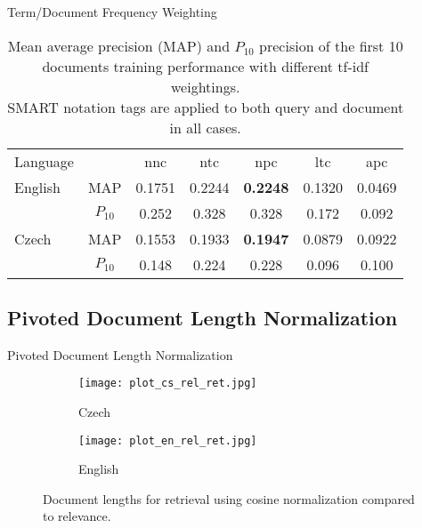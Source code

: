 \documentclass{beamer}
\begin{document}
\begin{frame}{Term/Document Frequency Weighting}

\begin{table}[htpb]
	\centering
	\caption{Mean average precision (MAP) and $P_{10}$ precision of the first
		10 documents training performance with different tf-idf weightings.\\
	SMART notation tags are applied to both query and document in all cases.\\}
	\label{tab:tfidf}
	\begin{tabular}{@{}l|cccccc@{}}
		\toprule
		Language & & nnc & ntc & npc & ltc & apc \\
		\cmidrule(r){1-1}\cmidrule(lr){2-2}\cmidrule(lr){3-3}\cmidrule(lr){4-4}\cmidrule(lr){5-5}\cmidrule(lr){6-6}\cmidrule(l){7-7}
		English & MAP & 0.1751 & 0.2244 & \textbf{0.2248} & 0.1320 & 0.0469 \\
				& \small{$P_{10}$} & \small{0.252} & \small{0.328} & \small{0.328} & \small{0.172} & \small{0.092} \\
		\cmidrule(r){1-1}\cmidrule(lr){2-2}\cmidrule(lr){3-3}\cmidrule(lr){4-4}\cmidrule(lr){5-5}\cmidrule(lr){6-6}\cmidrule(l){7-7}
		Czech & MAP & 0.1553 & 0.1933 & \textbf{0.1947} & 0.0879 & 0.0922 \\
		& \small{$P_{10}$} & \small{0.148} & \small{0.224} & \small{0.228} & \small{0.096} & \small{0.100} \\
		\bottomrule
	\end{tabular}
\end{table}

\end{frame}

\subsection{Pivoted Document Length Normalization}

\begin{frame}{Pivoted Document Length Normalization}

\begin{figure}[htpb]
	\centering
	\begin{subfigure}{0.45\textwidth}
		\texttt{[image: plot\_cs\_rel\_ret.jpg]}
		\caption{Czech}
		\label{fig:cs_cosine}
	\end{subfigure}
	\hfill
	\begin{subfigure}{0.45\textwidth}
		\texttt{[image: plot\_en\_rel\_ret.jpg]}
		\caption{English}
		\label{fig:en_cosine}
	\end{subfigure}
	\caption{Document lengths for retrieval using cosine normalization compared
	to relevance.}
	\label{fig:cosine}
\end{figure}

\end{frame}
\end{document}
